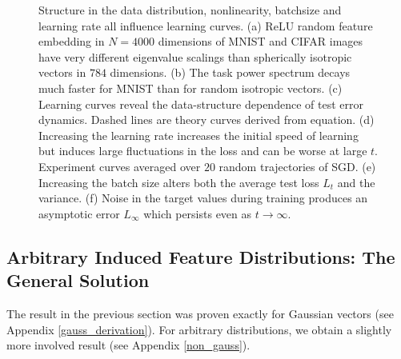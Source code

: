 \documentclass{article} %
\begin{document}
\begin{figure}[t]
    \caption{Structure in the data distribution, nonlinearity, batchsize and learning rate all influence learning curves. (a) ReLU random feature embedding in $N=4000$ dimensions of MNIST and CIFAR images have very different eigenvalue scalings than spherically isotropic vectors in $784$ dimensions. (b) The task power spectrum decays much faster for MNIST than for random isotropic vectors. (c) Learning curves reveal the data-structure dependence of test error dynamics. Dashed lines are theory curves derived from equation. 
    (d) Increasing the learning rate increases the initial speed of learning but induces large fluctuations in the loss and can be worse at large $t$. Experiment curves averaged over $20$ random trajectories of SGD. (e) Increasing the batch size alters both the average test loss $L_t$ and the variance. (f)  Noise in the target values during training produces an asymptotic error $L_{\infty}$ which persists even as $t \to \infty$. }
    \label{fig:feature_spectra_learning_curve}
\end{figure}


\subsection{Arbitrary Induced Feature Distributions: The General Solution}\label{th_general_fourth}

The result in the previous section was proven exactly for Gaussian vectors (see Appendix \ref{gauss_derivation}). For arbitrary distributions, we obtain a slightly more involved result (see Appendix \ref{non_gauss}).
\end{document}
